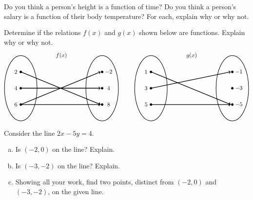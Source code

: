 \documentclass[11pt,letterpaper]{article}
\begin{document}
\prob Do you think a person's height is a function of time? Do you think a person's salary is a function of their body temperature? For each, explain why or why not. \pspace


\prob Determine if the relations $f(x)$ and $g(x)$ shown below are functions. Explain why or why not. 
	\[
	\begin{tikzpicture}
	\node at (2.5,2) {$f(x)$};
	\draw[line width=0.03cm] (0,0) circle (1 and 2);
	\draw[line width=0.03cm] (5,0) circle (1 and 2);
	
	\draw[fill=black] (0,1) circle (0.07);
	\draw[fill=black] (0,0) circle (0.07);
	\draw[fill=black] (0,-1) circle (0.07);
	
	\draw[fill=black] (5,1) circle (0.07);
	\draw[fill=black] (5,0) circle (0.07);
	\draw[fill=black] (5,-1) circle (0.07);
	
	\draw[line width=0.04cm,->] (0,1) -- (4.9,-1);
	\draw[line width=0.04cm,->] (0,0) -- (4.9,0);
	\draw[line width=0.04cm,->] (0,-1) -- (4.9,1);
	\draw[line width=0.04cm,->] (0,-1) -- (4.9,-1);
	
	\node at (-0.3,1) {$2$};
	\node at (-0.3,0) {$4$};
	\node at (-0.3,-1) {$6$};
	
	\node at (5.4,1) {$-2$};
	\node at (5.4,0) {$4$};
	\node at (5.4,-1) {$8$};
	
	\tikzset{shift={(8,0)}}
	\node at (2.5,2) {$g(x)$};
	\draw[line width=0.03cm] (0,0) circle (1 and 2);
	\draw[line width=0.03cm] (5,0) circle (1 and 2);
	
	\draw[fill=black] (0,1) circle (0.07);
	\draw[fill=black] (0,0) circle (0.07);
	\draw[fill=black] (0,-1) circle (0.07);
	
	\draw[fill=black] (5,1) circle (0.07);
	\draw[fill=black] (5,0) circle (0.07);
	\draw[fill=black] (5,-1) circle (0.07);
	
	\draw[line width=0.04cm,->] (0,1) -- (4.9,-1);
	\draw[line width=0.04cm,->] (0,0) -- (4.9,1);
	\draw[line width=0.04cm,->] (0,-1) -- (4.9,-1);
	
	\node at (-0.3,1) {$1$};
	\node at (-0.3,0) {$3$};
	\node at (-0.3,-1) {$5$};
	
	\node at (5.4,1) {$-1$};
	\node at (5.4,0) {$-3$};
	\node at (5.4,-1) {$-5$};
	\end{tikzpicture}
	\] \pspace


\prob Consider the line $2x - 5y= 4$.
	\begin{enumerate}[(a)]
	\item Is $(-2, 0)$ on the line? Explain.
	\item Is $(-3, -2)$ on the line? Explain.
	\item Showing all your work, find two points, distinct from $(-2, 0)$ and $(-3, -2)$, on the given line. 
	\end{enumerate} \pspace
\end{document}

